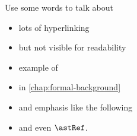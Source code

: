 
\dedication{\raggedleft\emph{To \_,\\
Something short and sweeet.}}



% 

\maketitle


\begingroup

  \let\cleardoublepage\clearpage




Use some words to talk about
\begin{itemize}
    \item lots of hyperlinking
    \item but not visible for readability
    \item example of 
    \item in \cref{chap:formal-background}
    \item and emphasis like the following 
    \item and even $\astRef$.
\end{itemize}

